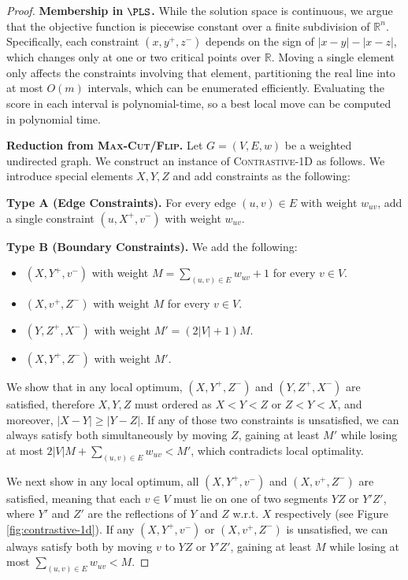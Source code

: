 \documentclass{article}
\theoremstyle{definition}  %
\theoremstyle{plain}
\numberwithin{observation}{section}
\numberwithin{claim}{section}
\numberwithin{fact}{section}
\numberwithin{lemma}{section}
\numberwithin{proposition}{section}
\numberwithin{theorem}{section}
\numberwithin{corollary}{section}
\numberwithin{definition}{section}
\theoremstyle{plain}
\begin{document}
\begin{proof}

\textbf{Membership in $\PLS$.}
While the solution space is continuous, we argue that the objective function is piecewise constant over a finite subdivision of $\mathbb{R}^n$. Specifically, each constraint $(x, y^+, z^-)$ depends on the sign of $|x - y| - |x - z|$, which changes only at one or two critical points over $\mathbb{R}$. Moving a single element only affects the constraints involving that element, partitioning the real line into at most $O(m)$ intervals, which can be enumerated efficiently. Evaluating the score in each interval is polynomial-time, so a best local move can be computed in polynomial time.

\textbf{Reduction from \textsc{Max-Cut/Flip}.} Let $G = (V, E, w)$ be a weighted undirected graph. We construct an instance of \textsc{Contrastive-1D} as follows. We introduce special elements $X, Y, Z$ and add constraints as the following:

\textbf{Type A (Edge Constraints).} For every edge $(u, v) \in E$ with weight $w_{uv}$, add a single constraint $(u, X^+, v^-)$ with weight $w_{uv}$.

\textbf{Type B (Boundary Constraints).} We add the following:
\begin{itemize}
    \item $(X, Y^+, v^-)$ with weight $M = \sum_{(u,v) \in E} w_{uv} + 1$ for every $v \in V$.
    \item $(X, v^+, Z^-)$ with weight $M$ for every $v \in V$.
    \item $(Y, Z^+, X^-)$ with weight $M' = (2 |V| + 1)M$.
    \item $(X, Y^+, Z^-)$ with weight $M'$.
\end{itemize}

We show that in any local optimum, $(X, Y^+, Z^-)$ and $(Y, Z^+, X^-)$ are satisfied, therefore $X, Y, Z$ must ordered as $X < Y < Z$ or $Z < Y < X$, and moreover, $|X - Y| \geq |Y - Z|$. If any of those two constraints is unsatisfied, we can always satisfy both simultaneously by moving $Z$, gaining at least $M'$ while losing at most $2 |V| M + \sum_{(u,v) \in E} w_{uv} < M'$, which contradicts local optimality.

We next show in any local optimum, all $(X, Y^+, v^-)$ and $(X, v^+, Z^-)$ are satisfied, meaning that each $v \in V$ must lie on one of two segments $YZ$ or $Y'Z'$, where $Y'$ and $Z'$ are the reflections of $Y$ and $Z$ w.r.t. $X$ respectively (see Figure \ref{fig:contrastive-1d}). If any $(X, Y^+, v^-)$ or $(X, v^+, Z^-)$ is unsatisfied, we can always satisfy both by moving $v$ to $YZ$ or $Y'Z'$, gaining at least $M$ while losing at most $\sum_{(u,v) \in E} w_{uv} < M$.


\end{proof}
\end{document}
